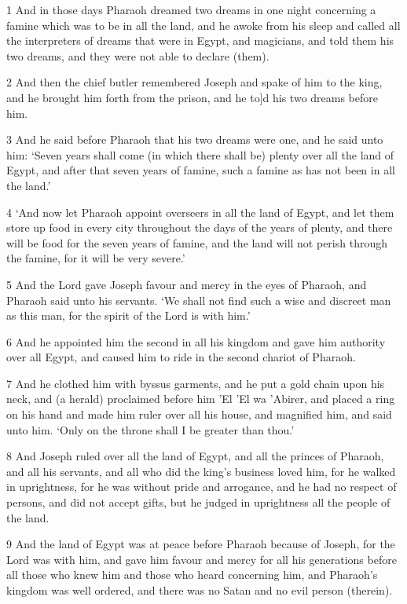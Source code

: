 \par 1 And in those days Pharaoh dreamed two dreams in one night concerning a famine which was to be in all the land, and he awoke from his sleep and called all the interpreters of dreams that were in Egypt, and magicians, and told them his two dreams, and they were not able to declare (them).
\par 2 And then the chief butler remembered Joseph and spake of him to the king, and he brought him forth from the prison, and he to]d his two dreams before him.
\par 3 And he said before Pharaoh that his two dreams were one, and he said unto him: ‘Seven years shall come (in which there shall be) plenty over all the land of Egypt, and after that seven years of famine, such a famine as has not been in all the land.’
\par 4 ‘And now let Pharaoh appoint overseers in all the land of Egypt, and let them store up food in every city throughout the days of the years of plenty, and there will be food for the seven years of famine, and the land will not perish through the famine, for it will be very severe.’
\par 5 And the Lord gave Joseph favour and mercy in the eyes of Pharaoh, and Pharaoh said unto his servants. ‘We shall not find such a wise and discreet man as this man, for the spirit of the Lord is with him.’
\par 6 And he appointed him the second in all his kingdom and gave him authority over all Egypt, and caused him to ride in the second chariot of Pharaoh.
\par 7 And he clothed him with byssus garments, and he put a gold chain upon his neck, and (a herald) proclaimed before him 'El 'El wa 'Abirer, and placed a ring on his hand and made him ruler over all his house, and magnified him, and said unto him. ‘Only on the throne shall I be greater than thou.’
\par 8 And Joseph ruled over all the land of Egypt, and all the princes of Pharaoh, and all his servants, and all who did the king's business loved him, for he walked in uprightness, for he was without pride and arrogance, and he had no respect of persons, and did not accept gifts, but he judged in uprightness all the people of the land.
\par 9 And the land of Egypt was at peace before Pharaoh because of Joseph, for the Lord was with him, and gave him favour and mercy for all his generations before all those who knew him and those who heard concerning him, and Pharaoh's kingdom was well ordered, and there was no Satan and no evil person (therein).
